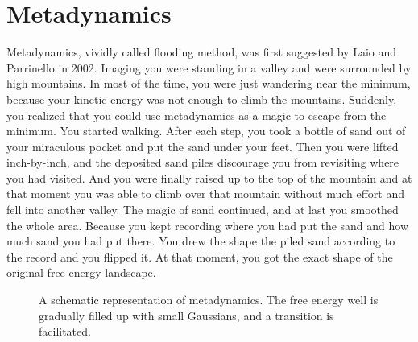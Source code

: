 \section{Metadynamics\label{Sec:ES:metadynamics}}
Metadynamics, vividly called flooding method, was first suggested by Laio and Parrinello in 2002.\cite{LaioPNAS2002} 
Imaging you were standing in a valley and were surrounded by high mountains. In most of the time, you were just wandering near the minimum, because your kinetic energy was not enough to climb the mountains. Suddenly, you realized that you could use metadynamics as a magic to escape from the minimum. You started walking. After each step, you took a bottle of sand out of your miraculous pocket and put the sand under your feet. Then you were lifted inch-by-inch, and the deposited sand piles discourage you from revisiting where you had visited. And you were finally raised up to the top of the mountain and at that moment you was able to climb over that mountain without much effort and fell into another valley. The magic of sand continued, and at last you smoothed the whole area. Because you kept recording where you had put the sand and how much sand you had put there. You drew the shape the piled sand according to the record and you flipped it. At that moment, you got the exact shape of the original free energy landscape. 
\begin{figure}[htbp]
	\centering
	\caption{A schematic representation of metadynamics. The free energy well is gradually filled up with small Gaussians, and a transition is facilitated.}\label{Fig:ES:metadynamics}
\end{figure}

